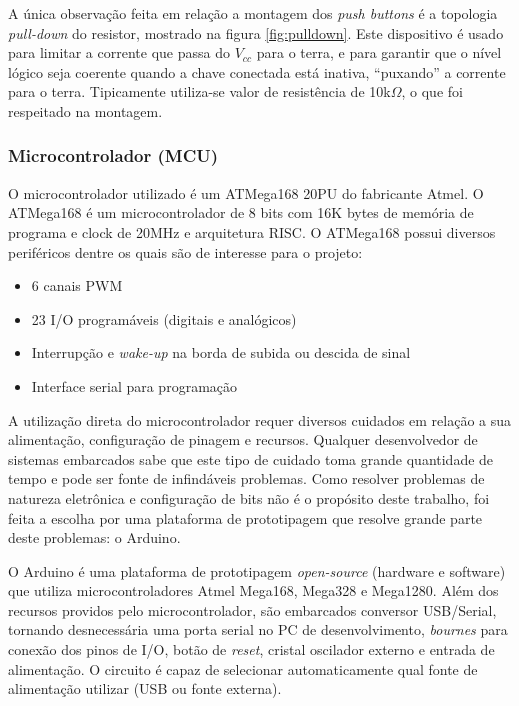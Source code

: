 \documentclass[a4paper,11pt]{article}
\begin{document}
A única observação feita em relação a montagem dos \textit{push buttons} é a
topologia \textit{pull-down} do resistor, mostrado na figura \ref{fig:pulldown}.
Este dispositivo é usado para limitar a corrente que passa do $V_{cc}$ para o
terra, e para garantir que o nível lógico seja coerente quando a chave conectada
está inativa, ``puxando'' a corrente para o terra. Tipicamente utiliza-se valor
de resistência de 10k$\Omega$, o que foi respeitado na montagem.



\subsubsection{Microcontrolador (MCU)}
\label{sec:mcu}
O microcontrolador utilizado é um ATMega168 20PU do fabricante
Atmel\textsuperscript{\textregistered}. O ATMega168\cite{atmega} é um
microcontrolador de 8 bits com 16K bytes de memória de programa e clock de 20MHz
e arquitetura RISC. O ATMega168 possui diversos periféricos dentre os quais são
de interesse para o projeto:
\begin{itemize}
  \item 6 canais PWM
  \item 23 I/O programáveis (digitais e analógicos)
  \item Interrupção e \textit{wake-up} na borda de subida ou descida de sinal
  \item Interface serial para programação
\end{itemize}

A utilização direta do microcontrolador requer diversos cuidados em relação a
sua alimentação, configuração de pinagem e recursos. Qualquer desenvolvedor de
sistemas embarcados sabe que este tipo de cuidado toma grande quantidade de
tempo e pode ser fonte de infindáveis problemas. Como resolver problemas de
natureza eletrônica e configuração de bits não é o propósito deste trabalho,
foi feita a escolha por uma plataforma de prototipagem que resolve grande parte
deste problemas: o Arduino\cite{arduino}\cite{oxer2009practical}.

O Arduino é uma plataforma de prototipagem \textit{open-source} (hardware e
software) que utiliza microcontroladores Atmel Mega168, Mega328 e Mega1280. Além
dos recursos providos pelo microcontrolador, são embarcados conversor
USB/Serial, tornando desnecessária uma porta serial no PC de desenvolvimento,
\textit{bournes} para conexão dos pinos de I/O, botão de \textit{reset},
cristal oscilador externo e entrada de alimentação. O circuito é capaz
de selecionar automaticamente qual fonte de alimentação utilizar (USB ou fonte
externa).
\end{document}
